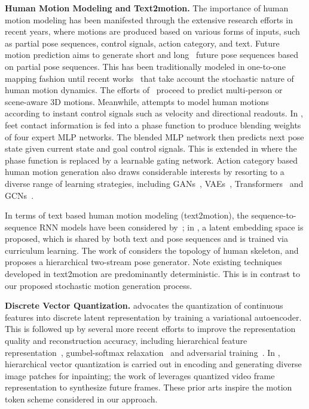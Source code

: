 \documentclass[runningheads]{llncs}
\begin{document}
\noindent\textbf{Human Motion Modeling and Text2motion.}
The importance of human motion modeling has been manifested through the extensive research efforts in recent years, where motions are produced based on various forms of inputs, such as partial pose sequences, control signals, action category, and text. Future motion prediction aims to generate short \cite{xu2017lie} and long~\cite{liu2019towards,pavllo2020modeling} future pose sequences based on partial pose sequences. This has been traditionally modeled in one-to-one mapping fashion until recent works~\cite{aliakbarian2021contextually,yuan2020dlow,mao2021generating} that take account the stochastic nature of human motion dynamics. The efforts of~\cite{wang2021multi,adeli2020socially,cao2020long,corona2020context} proceed to predict multi-person or scene-aware 3D motions. Meanwhile, \cite{holden2017phase,holden2020learned,starke2019neural} attempts to model human motions according to instant control signals such as velocity and directional readouts. In \cite{holden2017phase}, feet contact information is fed into a phase function to produce blending weights of four expert MLP networks. The blended MLP network then predicts next pose state given current state and goal control signals. This is extended in \cite{van2017neural,holden2020learned} where the phase function is replaced by a learnable gating network. Action category based human motion generation also draws considerable interests by resorting to a diverse range of learning strategies, including GANs~\cite{wang2020learning}, VAEs~\cite{guo2020action2motion,guo2022action2video}, Transformers~\cite{petrovich2021action} and GCNs~\cite{yu2020structure}. 

In terms of text based human motion modeling (text2motion), the sequence-to-sequence RNN models have been considered by~\cite{lin2018generating,plappert2018learning}; in \cite{ahuja2019language2pose}, a latent embedding space is proposed, which is shared by both text and pose sequences and is trained via curriculum learning. The work of \cite{ghosh2021synthesis} considers the topology of human skeleton, and proposes a hierarchical two-stream pose generator. Note existing techniques developed in text2motion are predominantly deterministic. 
This is in contrast to our proposed stochastic motion generation process. 

\noindent\textbf{Discrete Vector Quantization.} \cite{van2017neural} advocates the quantization of continuous features into discrete latent representation by training a variational autoencoder. This is followed up by several more recent efforts to improve the representation quality and reconstruction accuracy, including hierarchical feature representation~\cite{razavi2019generating}, gumbel-softmax relaxation~\cite{ramesh2021zero} and adversarial training~\cite{esser2021taming}. In \cite{peng2021generating}, hierarchical vector quantization is carried out in encoding and generating diverse image patches for inpainting; the work of \cite{rakhimov2020latent} leverages quantized video frame representation to synthesize future frames. These prior arts inspire the motion token scheme considered in our approach.
\end{document}

